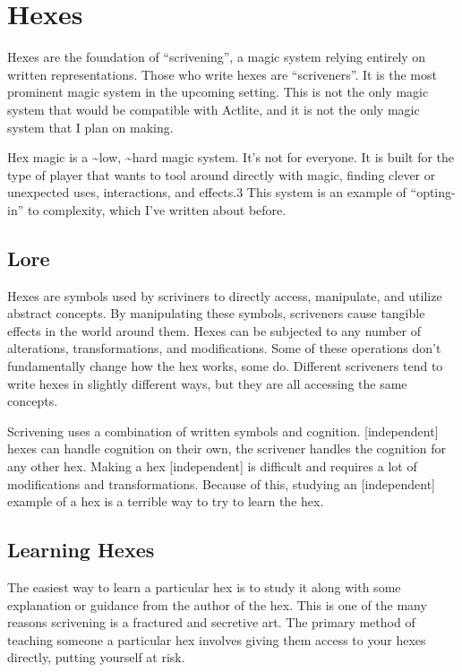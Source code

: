 \documentclass[
  letterpaper,
  DIV=11,
  numbers=noendperiod]{scrartcl}
\begin{document}
\section{Hexes}\label{hexes}

Hexes are the foundation of ``scrivening'', a magic system relying
entirely on written representations. Those who write hexes are
``scriveners''. It is the most prominent magic system in the upcoming
setting. This is not the only magic system that would be compatible with
Actlite, and it is not the only magic system that I plan on making.

Hex magic is a \textasciitilde low, \textasciitilde hard magic system.
It's not for everyone. It is built for the type of player that wants to
tool around directly with magic, finding clever or unexpected uses,
interactions, and effects.3 This system is an example of ``opting-in''
to complexity, which I've written about before.

\subsection{Lore}\label{lore}

Hexes are symbols used by scriviners to directly access, manipulate, and
utilize abstract concepts. By manipulating these symbols, scriveners
cause tangible effects in the world around them. Hexes can be subjected
to any number of alterations, transformations, and modifications. Some
of these operations don't fundamentally change how the hex works, some
do. Different scriveners tend to write hexes in slightly different ways,
but they are all accessing the same concepts.

Scrivening uses a combination of written symbols and cognition.
{[}independent{]} hexes can handle cognition on their own, the scrivener
handles the cognition for any other hex. Making a hex {[}independent{]}
is difficult and requires a lot of modifications and transformations.
Because of this, studying an {[}independent{]} example of a hex is a
terrible way to try to learn the hex.

\subsection{Learning Hexes}\label{learning-hexes}

The easiest way to learn a particular hex is to study it along with some
explanation or guidance from the author of the hex. This is one of the
many reasons scrivening is a fractured and secretive art. The primary
method of teaching someone a particular hex involves giving them access
to your hexes directly, putting yourself at risk.
\end{document}

